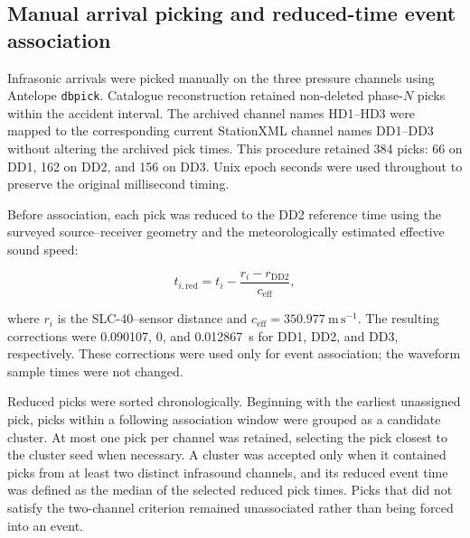 %

\subsection{Manual arrival picking and reduced-time event association}
\label{sec:methods_catalogue_association}

Infrasonic arrivals were picked manually on the three pressure channels using
Antelope \texttt{dbpick}.  Catalogue reconstruction retained non-deleted
phase-\(N\) picks within the accident interval.  The archived channel names
HD1--HD3 were mapped to the corresponding current StationXML channel names
DD1--DD3 without altering the archived pick times.  This procedure retained
384 picks: 66 on DD1, 162 on DD2, and 156 on DD3.  Unix epoch seconds were used
throughout to preserve the original millisecond timing.

Before association, each pick was reduced to the DD2 reference time using the
surveyed source--receiver geometry and the meteorologically estimated effective
sound speed:

\begin{equation}
t_{i,\mathrm{red}} = t_i - \frac{r_i-r_{\mathrm{DD2}}}{c_{\mathrm{eff}}},
\label{eq:reduced_pick_time}
\end{equation}

where \(r_i\) is the SLC-40--sensor distance and
\(c_{\mathrm{eff}}=350.977\ \mathrm{m\,s^{-1}}\).  The resulting corrections
were 0.090107, 0, and 0.012867~s for DD1, DD2, and DD3, respectively.  These
corrections were used only for event association; the waveform sample times
were not changed.

Reduced picks were sorted chronologically.  Beginning with the earliest
unassigned pick, picks within a following association window were grouped as a
candidate cluster.  At most one pick per channel was retained, selecting the
pick closest to the cluster seed when necessary.  A cluster was accepted only
when it contained picks from at least two distinct infrasound channels, and its
reduced event time was defined as the median of the selected reduced pick
times.  Picks that did not satisfy the two-channel criterion remained
unassociated rather than being forced into an event.

